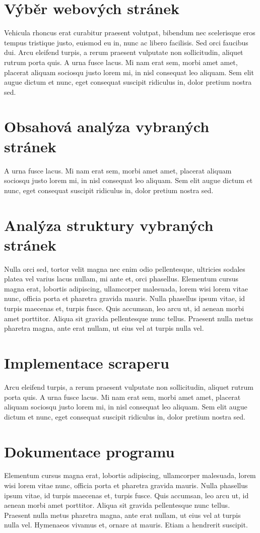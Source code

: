 \documentclass[11pt,a4paper]{article}
\begin{document}
\section{Výběr webových stránek}
Vehicula rhoncus erat curabitur praesent volutpat, bibendum nec scelerisque eros tempus tristique justo, euismod eu in, nunc ac libero facilisis. Sed orci faucibus dui. Arcu eleifend turpis, a rerum praesent vulputate non sollicitudin, aliquet rutrum porta quis. A urna fusce lacus. Mi nam erat sem, morbi amet amet, placerat aliquam sociosqu justo lorem mi, in nisl consequat leo aliquam. Sem elit augue dictum et nunc, eget consequat suscipit ridiculus in, dolor pretium nostra sed.

\section{Obsahová analýza vybraných stránek}
A urna fusce lacus. Mi nam erat sem, morbi amet amet, placerat aliquam sociosqu justo lorem mi, in nisl consequat leo aliquam. Sem elit augue dictum et nunc, eget consequat suscipit ridiculus in, dolor pretium nostra sed.

\section{Analýza struktury vybraných stránek}
Nulla orci sed, tortor velit magna nec enim odio pellentesque, ultricies sodales platea vel varius lacus nullam, mi ante et, orci phasellus. Elementum cursus magna erat, lobortis adipiscing, ullamcorper malesuada, lorem wisi lorem vitae nunc, officia porta et pharetra gravida mauris. Nulla phasellus ipsum vitae, id turpis maecenas et, turpis fusce. Quis accumsan, leo arcu ut, id aenean morbi amet porttitor. Aliqua sit gravida pellentesque nunc tellus. Praesent nulla metus pharetra magna, ante erat nullam, ut eius vel at turpis nulla vel.

\section{Implementace scraperu}
Arcu eleifend turpis, a rerum praesent vulputate non sollicitudin, aliquet rutrum porta quis. A urna fusce lacus. Mi nam erat sem, morbi amet amet, placerat aliquam sociosqu justo lorem mi, in nisl consequat leo aliquam. Sem elit augue dictum et nunc, eget consequat suscipit ridiculus in, dolor pretium nostra sed.

\section{Dokumentace programu}
Elementum cursus magna erat, lobortis adipiscing, ullamcorper malesuada, lorem wisi lorem vitae nunc, officia porta et pharetra gravida mauris. Nulla phasellus ipsum vitae, id turpis maecenas et, turpis fusce. Quis accumsan, leo arcu ut, id aenean morbi amet porttitor. Aliqua sit gravida pellentesque nunc tellus. Praesent nulla metus pharetra magna, ante erat nullam, ut eius vel at turpis nulla vel. Hymenaeos vivamus et, ornare at mauris. Etiam a hendrerit suscipit.
\end{document}
